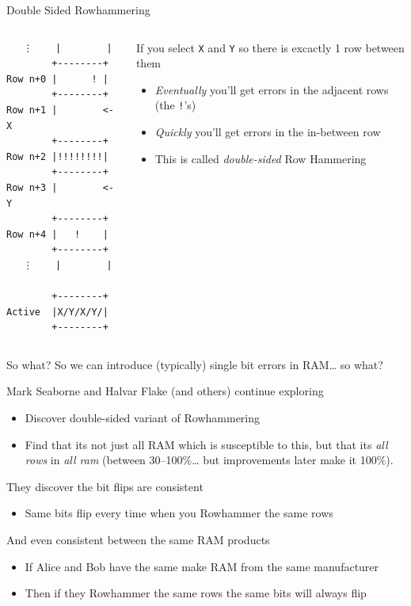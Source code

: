 \documentclass[9pt,aspectratio=169]{beamer}
\begin{document}
\begin{frame}[label={sec:orgd3b1901},fragile]{Double Sided Rowhammering}
 \begin{columns}
\begin{column}[t]{0.2\columnwidth}
\begin{verbatim}
   ⋮    |        |
        +--------+
Row n+0 |      ! |
        +--------+
Row n+1 |        <- X
        +--------+
Row n+2 |!!!!!!!!| 
        +--------+
Row n+3 |        <- Y 
        +--------+
Row n+4 |   !    |   
        +--------+
   ⋮    |        |

        +--------+
Active  |X/Y/X/Y/|
        +--------+
\end{verbatim}
\end{column}

\begin{column}[t]{0.79\columnwidth}
If you select \texttt{X} and \texttt{Y} so there is excactly 1 row between them
\begin{itemize}
\item \emph{Eventually} you'll get errors in the adjacent rows (the \texttt{!}'s)
\item \emph{Quickly} you'll get errors in the in-between row
\item This is called \emph{double-sided} Row Hammering
\end{itemize}
\end{column}
\end{columns}
\end{frame}

\begin{frame}[label={sec:orgb351906}]{So what?}
So we can introduce (typically) single bit errors in RAM\ldots{} so what?

\begin{block}{Mark Seaborne and Halvar Flake (and others) continue exploring}
\begin{itemize}
\item Discover double-sided variant of Rowhammering
\item Find that its not just all RAM which is susceptible to this, but that its \emph{all rows} in \emph{all ram} (between 30--100\%\ldots{} but improvements later make it 100\%).
\end{itemize}

They discover the bit flips are consistent
\begin{itemize}
\item Same bits flip every time when you Rowhammer the same rows
\end{itemize}

And even consistent between the same RAM products
\begin{itemize}
\item If Alice and Bob have the same make RAM from the same manufacturer
\item Then if they Rowhammer the same rows the same bits will always flip
\end{itemize}
\end{block}
\end{frame}
\end{document}
